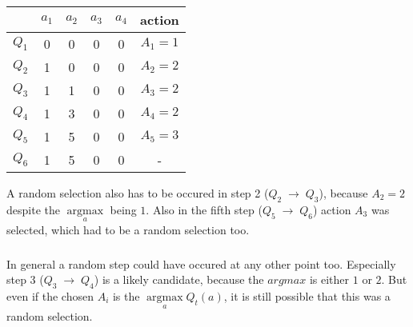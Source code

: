 \documentclass[12pt,a4paper]{article}
\begin{document}
\begin{center}
\begin{tabular}{c |c c c c | c} 
    & $a_{1}$ & $a_{2}$ & $a_{3}$ & $a_{4}$ & action \\ [0.5ex] 
    \hline
    $Q_{1}$ & 0 & 0 & 0 & 0 & $A_{1}=1$ \\
    \hline
    $Q_{2}$ & 1 & 0 & 0 & 0 & $A_{2}=2$ \\ 
    \hline
    $Q_{3}$ & 1 & 1 & 0 & 0 & $A_{3}=2$ \\
    \hline
    $Q_{4}$ & 1 & 3 & 0 & 0 & $A_{4}=2$ \\
    \hline
    $Q_{5}$ & 1 & 5 & 0 & 0 & $A_{5}=3$ \\
    \hline
    $Q_{6}$ & 1 & 5 & 0 & 0 & - \\
    \hline
\end{tabular}
\end{center}

A random selection also has to be occured in step 2 ($Q_{2} \; \rightarrow \; Q_{3}$), because $A_{2}=2$ despite the 
$\underset{a}{\operatorname{argmax}}$
being $1$. Also in the fifth step ($Q_{5} \; \rightarrow \; Q_{6}$) action $A_{3}$ was selected, 
which had to be a random selection too.


\subsubsection{}

In general a random step could have occured at any other point too. 
Especially step 3 ($Q_{3} \; \rightarrow \; Q_{4}$) is a likely candidate, because the $argmax$ is either $1$ or $2$.
But even if the chosen $A_{i}$ is the $\underset{a}{\operatorname{argmax}}Q_{t}(a)$, it is still possible that this was a random selection. 
\end{document}
